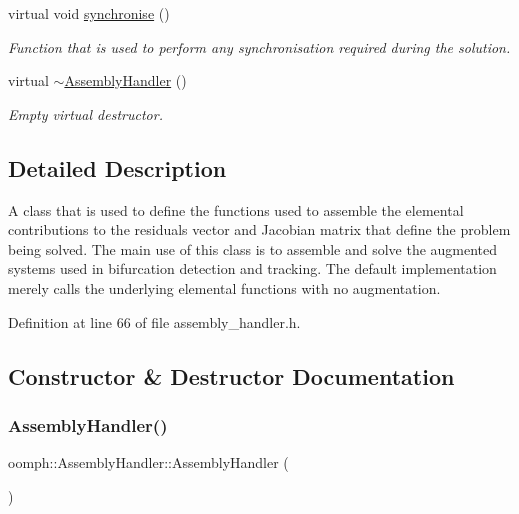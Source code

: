 \begin{DoxyCompactItemize}
$$virtual void \hyperlink{classoomph_1_1AssemblyHandler_a0ccef21253d997dd1a78ed26c2b99fce}{synchronise} ()
\begin{DoxyCompactList}\small\item\em Function that is used to perform any synchronisation required during the solution. \end{DoxyCompactList}\item 
virtual \hyperlink{classoomph_1_1AssemblyHandler_ab26633238200230ab57a20cc49e731de}{$\sim$\+Assembly\+Handler} ()
\begin{DoxyCompactList}\small\item\em Empty virtual destructor. \end{DoxyCompactList}\end{DoxyCompactItemize}


\subsection{Detailed Description}
A class that is used to define the functions used to assemble the elemental contributions to the residuals vector and Jacobian matrix that define the problem being solved. The main use of this class is to assemble and solve the augmented systems used in bifurcation detection and tracking. The default implementation merely calls the underlying elemental functions with no augmentation. 

Definition at line 66 of file assembly\+\_\+handler.\+h.



\subsection{Constructor \& Destructor Documentation}
\mbox{\label{classoomph_1_1AssemblyHandler_af3ab79744dce0b50370defdbf7981691}} 
\subsubsection{\texorpdfstring{Assembly\+Handler()}{AssemblyHandler()}}
{\footnotesize\ttfamily oomph\+::\+Assembly\+Handler\+::\+Assembly\+Handler (\begin{DoxyParamCaption}{ }\end{DoxyParamCaption})\hspace{0.3cm}{\ttfamily [inline]}}



